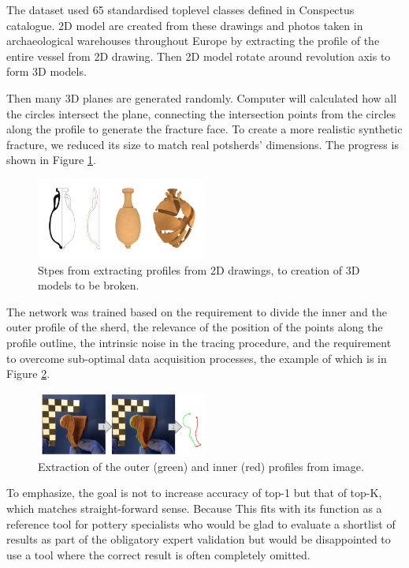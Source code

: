 \documentclass[journal]{IEEEtran}
\begin{document}
	The dataset used 65 standardised toplevel classes defined in Conspectus catalogue\cite{first_phase}. 2D model are created from these drawings and photos taken in archaeological warehouses throughout Europe by extracting the profile of the entire vessel from 2D drawing. Then 2D model rotate around revolution axis to form 3D models.
	
	Then many 3D planes are generated randomly. Computer will calculated how all the circles intersect the plane, connecting the intersection points from the circles along the profile to generate the fracture face. To create a more realistic synthetic fracture, we reduced its size to match real potsherds’ dimensions. \cite{Dellepiane2017FromPT} The progress is shown in Figure \ref{process}.
	
	\begin{figure}[htbp]
		\centering
		\includegraphics[width=0.5\textwidth]{./picture/process.png}
		\caption{Stpes from extracting profiles from 2D drawings, to creation of 3D models to be broken.}
		\label{process}
	\end{figure} 
	
	The network was trained based on the requirement to divide the inner and the outer profile of the sherd, the relevance of the position of the points along the profile outline, the intrinsic noise in the tracing procedure, and the requirement to overcome sub-optimal data acquisition processes\cite{ANICHINI2021102788}, the example of which is in Figure \ref{process2}.
	
	\begin{figure}[htbp]
		\centering
		\includegraphics[width=0.5\textwidth]{./picture/process2.png}
		\caption{Extraction of the outer (green) and inner (red) profiles from image.}
		\label{process2}
	\end{figure} 
	
	To emphasize, the goal is not to increase accuracy of top-1 but that of top-K, which matches straight-forward sense. Because This fits with its function as a reference tool for pottery specialists who would be glad to evaluate a shortlist of results as part of the obligatory expert validation but would be disappointed to use a tool where the correct result is often completely omitted.
	
\end{document}
